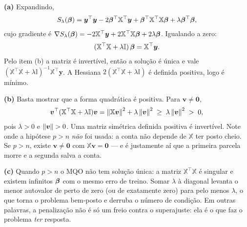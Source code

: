 \documentclass[11pt,a4paper]{article}
\begin{document}
\begin{solucao}
\textbf{(a)} Expandindo,
\[
  S_\lambda(\bm{\beta})=\bm y^\top\bm y-2\bm{\beta}^\top\mathbb{X}^\top\bm y
                   +\bm{\beta}^\top\mathbb{X}^\top\mathbb{X}\bm{\beta}+\lambda\bm{\beta}^\top\bm{\beta},
\]
cujo gradiente é
$\nabla S_\lambda(\bm{\beta})=-2\mathbb{X}^\top\bm y+2\mathbb{X}^\top\mathbb{X}\bm{\beta}+2\lambda\bm{\beta}$.
Igualando a zero:
\[
  (\mathbb{X}^\top\mathbb{X}+\lambda\mathbb{I})\,\bm{\beta}=\mathbb{X}^\top\bm y .
\]
Pelo item (b) a matriz é invertível, então a solução é única e vale
$(\mathbb{X}^\top\mathbb{X}+\lambda\mathbb{I})^{-1}\mathbb{X}^\top\bm y$. A Hessiana
$2(\mathbb{X}^\top\mathbb{X}+\lambda\mathbb{I})$ é definida positiva, logo é mínimo.

\smallskip
\textbf{(b)} Basta mostrar que a forma quadrática é positiva. Para
$\bm v\neq\bm 0$,
\[
  \bm v^\top(\mathbb{X}^\top\mathbb{X}+\lambda\mathbb{I})\bm v
  = \left\lVert \mathbb{X}\bm v \right\rVert^2+\lambda\left\lVert \bm v \right\rVert^2
  \;\ge\; \lambda\left\lVert \bm v \right\rVert^2 \;>\; 0 ,
\]
pois $\lambda>0$ e $\left\lVert \bm v \right\rVert>0$. Uma matriz simétrica definida positiva é
invertível. Note onde a hipótese $p>n$ \emph{não} foi usada: a conta não depende
de $\mathbb{X}$ ter posto cheio. Se $p>n$, existe $\bm v\neq\bm 0$ com
$\mathbb{X}\bm v=\bm 0$ --- e é justamente aí que a primeira parcela morre e a segunda
salva a conta.

\smallskip
\textbf{(c)} Quando $p>n$ o MQO não tem solução única: a matriz
$\mathbb{X}^\top\mathbb{X}$ é singular e existem infinitos $\bm{\beta}$ com o mesmo erro de
treino. Somar $\lambda$ à diagonal levanta o menor autovalor de perto de zero (ou
de exatamente zero) para pelo menos $\lambda$, o que torna o problema bem-posto e
derruba o número de condição. Em outras palavras, a penalização não é só um freio
contra o superajuste: ela é o que faz o problema \emph{ter} resposta.
\end{solucao}
\end{document}
